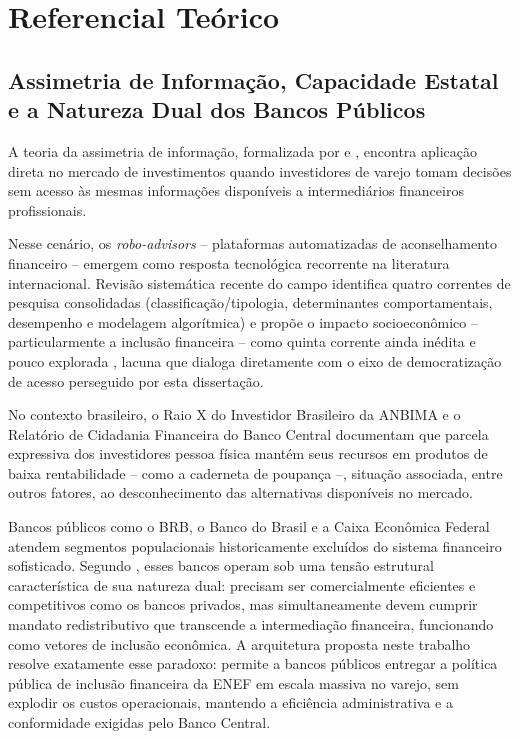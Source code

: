 \chapter{Referencial Te\'orico}
\label{cap:referencial}

\section{Assimetria de Informa\c{c}\~ao, Capacidade Estatal e a Natureza Dual dos Bancos P\'ublicos}
\label{sec:assimetria}

A teoria da assimetria de informa\c{c}\~ao, formalizada por
\textcite{akerlof1970} e \textcite{stiglitzweiss1981}, encontra
aplica\c{c}\~ao direta no mercado de investimentos quando investidores de
varejo tomam decis\~oes sem acesso \`as mesmas informa\c{c}\~oes
dispon\'iveis a intermedi\'arios financeiros profissionais.

Nesse cen\'ario, os \textit{robo-advisors} -- plataformas automatizadas
de aconselhamento financeiro -- emergem como resposta tecnol\'ogica
recorrente na literatura internacional. Revis\~ao sistem\'atica recente
do campo identifica quatro correntes de pesquisa consolidadas
(classifica\c{c}\~ao/tipologia, determinantes comportamentais, desempenho
e modelagem algor\'itmica) e prop\~oe o impacto socioecon\^omico --
particularmente a inclus\~ao financeira -- como quinta corrente ainda
in\'edita e pouco explorada \autocite{cardillo2024}, lacuna que dialoga
diretamente com o eixo de democratiza\c{c}\~ao de acesso perseguido por
esta disserta\c{c}\~ao.

No contexto brasileiro, o Raio X do Investidor Brasileiro da ANBIMA
\autocite{anbima2025} e o Relat\'orio de Cidadania Financeira do Banco
Central \autocite{bcb2023} documentam que parcela expressiva dos
investidores pessoa f\'isica mant\'em seus recursos em produtos de baixa
rentabilidade -- como a caderneta de poupan\c{c}a --, situa\c{c}\~ao
associada, entre outros fatores, ao desconhecimento das alternativas
dispon\'iveis no mercado.

Bancos p\'ublicos como o BRB, o Banco do Brasil e a Caixa Econ\^omica
Federal atendem segmentos populacionais historicamente exclu\'idos do
sistema financeiro sofisticado. Segundo \textcite{costa2016}, esses bancos
operam sob uma tens\~ao estrutural caracter\'istica de sua natureza dual:
precisam ser comercialmente eficientes e competitivos como os bancos
privados, mas simultaneamente devem cumprir mandato redistributivo que
transcende a intermedia\c{c}\~ao financeira, funcionando como vetores de
inclus\~ao econ\^omica. A arquitetura proposta neste trabalho resolve
exatamente esse paradoxo: permite a bancos p\'ublicos entregar a pol\'itica p\'ublica
de inclus\~ao financeira da ENEF em escala massiva no varejo, sem explodir
os custos operacionais, mantendo a efici\^encia administrativa e a
conformidade exigidas pelo Banco Central.

